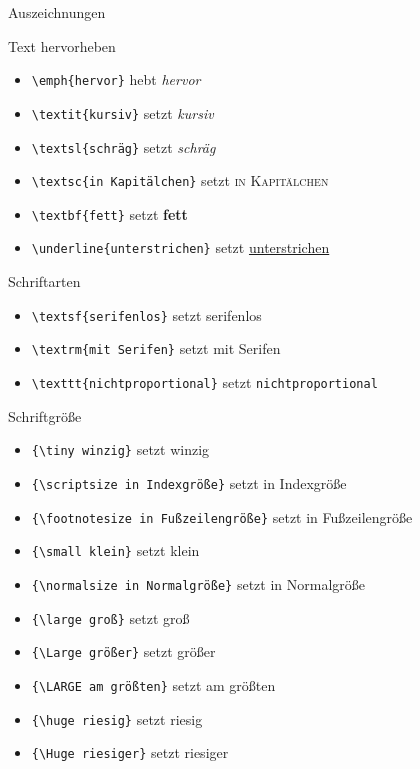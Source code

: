 \begin{Frame}[fragile]{Auszeichnungen}
  \begin{Block}{Text hervorheben}
    \begin{itemize}
      \item \lstinline-\emph{hervor}- hebt \emph{hervor}
      \item \lstinline-\textit{kursiv}- setzt \textit{kursiv}
      \item \lstinline-\textsl{schräg}- setzt \textsl{schräg}
      \item \lstinline-\textsc{in Kapitälchen}- setzt \textsc{in Kapitälchen}
      \item \lstinline-\textbf{fett}- setzt \textbf{fett} 
      \item \lstinline-\underline{unterstrichen}- setzt \underline{unterstrichen} 
    \end{itemize}
  \end{Block}
  
  \begin{Block}{Schriftarten}
    \begin{itemize}
      \item \lstinline-\textsf{serifenlos}- setzt \textsf{serifenlos}
      \item \lstinline-\textrm{mit Serifen}- setzt \textrm{mit Serifen}
      \item \lstinline-\texttt{nichtproportional}- setzt \texttt{nichtproportional}
    \end{itemize}
  \end{Block}
\end{Frame}

\begin{Frame}[fragile]{Schriftgröße}
  \begin{itemize}
    \item \lstinline-{\tiny winzig}- setzt {\tiny winzig}
    \item \lstinline-{\scriptsize in Indexgröße}- setzt {\scriptsize in Indexgröße}
    \item \lstinline-{\footnotesize in Fußzeilengröße}- setzt {\footnotesize in Fußzeilengröße}
    \item \lstinline-{\small klein}- setzt {\small klein}
    \item \lstinline-{\normalsize in Normalgröße}- setzt {\normalsize in Normalgröße}
    \item \lstinline-{\large groß}- setzt {\large groß}
    \item \lstinline-{\Large größer}- setzt {\Large größer}
    \item \lstinline-{\LARGE am größten}- setzt {\LARGE am größten}
    \item \lstinline-{\huge riesig}- setzt {\huge riesig}
    \item \lstinline-{\Huge riesiger}- setzt {\Huge riesiger}
  \end{itemize}
\end{Frame}

